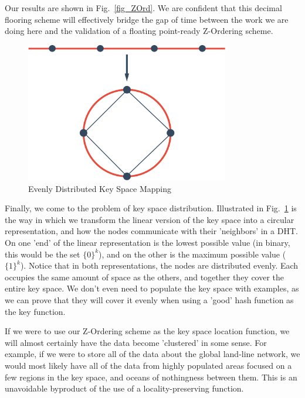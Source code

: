 \documentclass[10pt]{IEEEtran}
\begin{document}
\par Our results are shown in Fig.~\ref{fig_ZOrd}. We are confident that this decimal flooring scheme will effectively bridge the gap of time between the work we are doing here and the validation of a floating point-ready Z-Ordering scheme.

\begin{figure}[!t]
\centering
\includegraphics[width=3.5in]{finalRing}
\caption{Evenly Distributed Key Space Mapping}
\label{fig_kSpace}
\end{figure}

\par Finally, we come to the problem of key space distribution. Illustrated in Fig.~\ref{fig_kSpace} is the way in which we transform the linear version of the key space into a circular representation, and how the nodes communicate with their 'neighbors' in a DHT. On one 'end' of the linear representation is the lowest possible value (in binary, this would be the set $\{0\}^k$), and on the other is the maximum possible value ($\{1\}^k$). Notice that in both representations, the nodes are distributed evenly. Each occupies the same amount of space as the others, and together they cover the entire key space. We don't even need to populate the key space with examples, as we can prove that they will cover it evenly when using a 'good' hash function as the key function.

\par If we were to use our Z-Ordering scheme as the key space location function, we will almost certainly have the data become 'clustered' in some sense. For example, if we were to store all of the data about the global land-line network, we would most likely have all of the data from highly populated areas focused on a few regions in the key space, and oceans of nothingness between them. This is an unavoidable byproduct of the use of a locality-preserving function.
\end{document}
